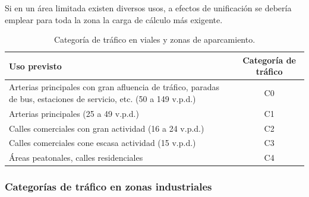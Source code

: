 Si en un área limitada existen diversos usos, a efectos de unificación se debería emplear para toda la zona la carga de cálculo más exigente.

\begin{table}[!htb]
\centering
\begin{tabular}{p{7cm}c}
\toprule
Uso previsto & Categoría de tráfico\\
\midrule
Arterias principales con gran afluencia de tráfico, paradas de bus, estaciones de servicio, etc. (50 a 149 v.p.d.) & C0\\
Arterias principales (25 a 49 v.p.d.) & C1\\
Calles comerciales con gran actividad (16 a 24 v.p.d.) & C2\\
Calles comerciales cone escasa actividad (15 v.p.d.) & C3\\
Áreas peatonales, calles residenciales & C4\\
\bottomrule
\end{tabular}
\caption{Categoría de tráfico en viales y zonas de aparcamiento.}
\label{categoriadetraficoenviales}
\end{table}


\subsubsection{Categorías de tráfico en zonas industriales}

